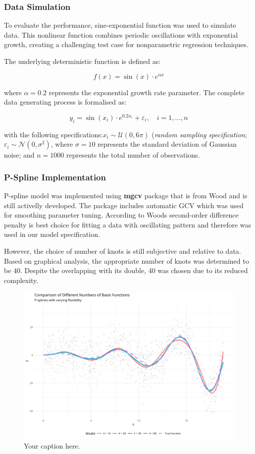 \documentclass[8pt,twocolumn]{article}
\begin{document}
\subsubsection{Data Simulation}

To evaluate the performance, sine-exponential function was used to simulate data.
This nonlinear function combines periodic oscillations with exponential growth, creating a
challenging test case for nonparametric regression techniques.

The underlying deterministic function is defined as:

$$f(x) = \sin(x) \cdot e^{\alpha x}$$

where $\alpha = 0.2$ represents the exponential growth rate parameter.
The complete data generating process is formalised as:

$$y_i = \sin(x_i) \cdot e^{0.2x_i} + \varepsilon_i, \quad i = 1,\ldots,n$$

with the following specifications:$x_i \sim \mathcal{U}(0, 6\pi)$ (\emph{random sampling specification};
$\varepsilon_i \sim \mathcal{N}(0, \sigma^2)$, where $\sigma = 10$ represents the standard deviation of Gaussian noise; and
$n = 1000$ represents the total number of observations.

\subsubsection{P-Spline Implementation}

P-spline model was implemented using \textbf{mgcv} package that is from Wood \cite{mgcv} and is still activelly developed.
The package includes automatic GCV which was used for smoothing parameter tuning.
According to Woods \cite{woods2017} second-order difference penalty is best choice for fitting
a data with oscillating pattern and therefore was used in our model specification.

However, the choice of number of knots is still subjective and relative to data. Based on
graphical analysis, the appropriate number of knots was determined to be 40. Despite the overlapping with
its double, 40 was chosen due to its reduced complexity.

\begin{figure}[htbp]
    \centering
    \includegraphics[width=0.8\columnwidth]{psplines_knots_comparison.png}
    \caption{Your caption here.}
    \label{fig:your_label}
    \vspace{-10pt}
\end{figure}
\end{document}
